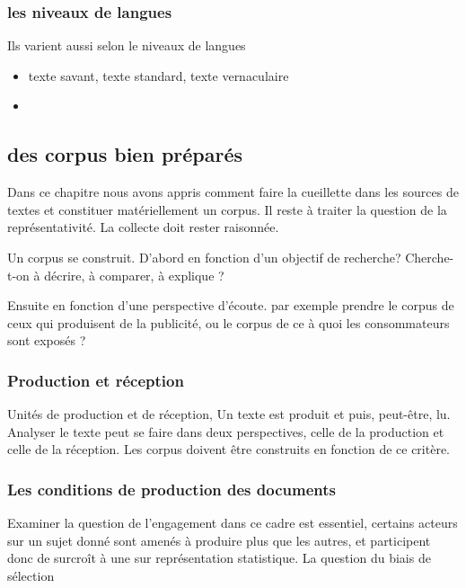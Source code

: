 \documentclass[
  letterpaper,
  DIV=11,
  numbers=noendperiod]{scrreprt}
\providecommand{\tightlist}{%
  \setlength{\itemsep}{0pt}\setlength{\parskip}{0pt}}\usepackage{longtable,booktabs,array}
\begin{document}
\subsubsection{les niveaux de langues}\label{les-niveaux-de-langues}

Ils varient aussi selon le niveaux de langues

\begin{itemize}
\tightlist
\item
  texte savant, texte standard, texte vernaculaire
\item
\end{itemize}

\subsection{des corpus bien
préparés}\label{des-corpus-bien-pruxe9paruxe9s}

Dans ce chapitre nous avons appris comment faire la cueillette dans les
sources de textes et constituer matériellement un corpus. Il reste à
traiter la question de la représentativité. La collecte doit rester
raisonnée.

Un corpus se construit. D'abord en fonction d'un objectif de recherche?
Cherche-t-on à décrire, à comparer, à explique ?

Ensuite en fonction d'une perspective d'écoute. par exemple prendre le
corpus de ceux qui produisent de la publicité, ou le corpus de ce à quoi
les consommateurs sont exposés ?

\subsubsection{Production et
réception}\label{production-et-ruxe9ception}

Unités de production et de réception, Un texte est produit et puis,
peut-être, lu. Analyser le texte peut se faire dans deux perspectives,
celle de la production et celle de la réception. Les corpus doivent être
construits en fonction de ce critère.

\subsubsection{Les conditions de production des
documents}\label{les-conditions-de-production-des-documents}

Examiner la question de l'engagement dans ce cadre est essentiel,
certains acteurs sur un sujet donné sont amenés à produire plus que les
autres, et participent donc de surcroît à une sur représentation
statistique. La question du biais de sélection
\end{document}
